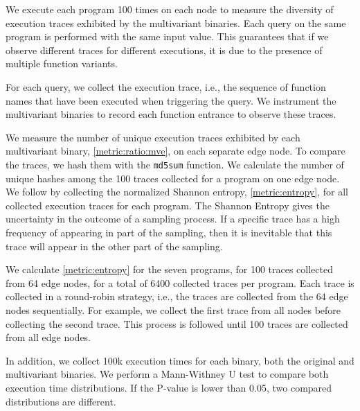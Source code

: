 We execute each program 100 times on each node to measure the diversity of execution traces exhibited by the multivariant binaries. Each query on the same program is performed with the same input value. This guarantees that if we observe different traces for different executions, it is due to the presence of multiple function variants. 

For each query, we collect the execution trace, i.e.,  the sequence of function names that have been executed when triggering the query.
We instrument the multivariant binaries to record each function entrance to observe these traces.


We measure the number of unique execution traces exhibited by each multivariant binary, \autoref{metric:ratio:mve}, on each separate edge node. To compare the traces, we hash them with the \texttt{md5sum} function.
We calculate the number of unique hashes among the 100 traces collected for a program on one edge node.
We follow by collecting the normalized Shannon entropy, \autoref{metric:entropy}, for all collected execution traces for each program.
The Shannon Entropy gives the uncertainty in the outcome of a sampling process.
If a specific trace has a high frequency of appearing in part of the sampling, then it is inevitable that this trace will appear in the other part of the sampling.


We calculate \autoref{metric:entropy} for the seven programs, for 100 traces collected from 64 edge nodes, for a total of 6400 collected traces per program.
Each trace is collected in a round-robin strategy, i.e., the traces are collected from the 64 edge nodes sequentially.
For example, we collect the first trace from all nodes before collecting the second trace.
This process is followed until 100 traces are collected from all edge nodes.


In addition, we collect 100k execution times for each binary, both the original and multivariant binaries.
We perform a Mann-Withney U test \cite{mann1947} to compare both execution time distributions. 
If the P-value is lower than 0.05, two compared distributions are different.

